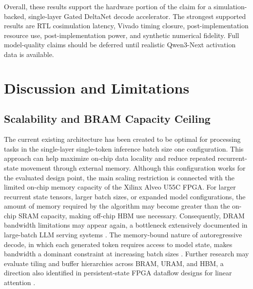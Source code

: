 ﻿\documentclass[conference]{IEEEtran}
\newcommand{\PaperRoot}{}
\renewcommand{\PaperRoot}{paper/}%
\renewcommand{\PaperRoot}{}%
\newcommand{\PaperInput}[1]{}
\begin{document}
\begin{table}[t]
\centering
\caption{Synthetic recurrent-state stress evidence.}
\label{tab:state_stress_results}
\scriptsize
\resizebox{\linewidth}{!}{\PaperInput{tables/recurrent_state_stress.tex}}
\end{table}

\begin{table}[t]
\centering
\caption{Recurrent-state storage and off-chip traffic accounting for MXFP4 $B=32$.}
\label{tab:state_traffic_results}
\scriptsize
\resizebox{\linewidth}{!}{\PaperInput{tables/state_storage_traffic.tex}}
\end{table}

Overall, these results support the hardware portion of the claim for a simulation-backed, single-layer Gated DeltaNet decode accelerator. The strongest supported results are RTL cosimulation latency, Vivado timing closure, post-implementation resource use, post-implementation power, and synthetic numerical fidelity. Full model-quality claims should be deferred until realistic Qwen3-Next activation data is available.

\section{Discussion and Limitations}

\subsection{Scalability and BRAM Capacity Ceiling}
The current existing architecture has been created to be optimal for processing tasks in the single-layer single-token inference batch size one configuration. This approach can help maximize on-chip data locality and reduce repeated recurrent-state movement through external memory. Although this configuration works for the evaluated design point, the main scaling restriction is connected with the limited on-chip memory capacity of the Xilinx Alveo U55C FPGA. For larger recurrent state tensors, larger batch sizes, or expanded model configurations, the amount of memory required by the algorithm may become greater than the on-chip SRAM capacity, making off-chip HBM use necessary. Consequently, DRAM bandwidth limitations may appear again, a bottleneck extensively documented in large-batch LLM serving systems \cite{b1,b4,b7}. The memory-bound nature of autoregressive decode, in which each generated token requires access to model state, makes bandwidth a dominant constraint at increasing batch sizes \cite{b5}. Further research may evaluate tiling and buffer hierarchies across BRAM, URAM, and HBM, a direction also identified in persistent-state FPGA dataflow designs for linear attention \cite{b10}.
\end{document}
